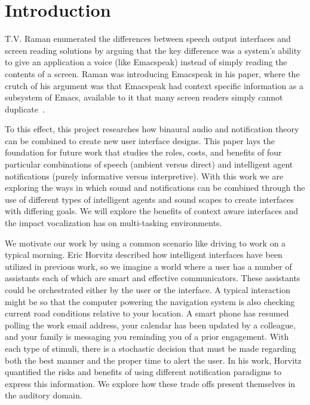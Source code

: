 \newpage                                                 \chapter{Introduction}
\renewcommand{\thepage }{\arabic{page}}                    \setcounter{page}{1}

T.V. Raman enumerated the differences between speech output interfaces and
screen reading solutions by arguing that the key difference was a system's
ability to give an application a voice (like Emacspeak) instead of simply reading 
the contents of a screen.  Raman was introducing Emacspeak in his paper, where 
the crutch of his argument was that Emacspeak had context specific information
as a subsystem of Emacs, available to it that many screen readers simply cannot 
duplicate~\cite{raman1996emacspeak}.

To this effect, this project researches how binaural audio and notification theory
can be combined to create new user interface designs. This paper lays the
foundation for future work that studies the roles, costs, and benefits  of four
particular combinations of speech (ambient versus direct) and intelligent agent
notifications (purely informative versus  interpretive). With this work we are 
exploring the ways in which sound and notifications can be combined through the 
use of different types of intelligent agents and sound scapes to create 
interfaces with differing goals.  We will explore the benefits of context
aware interfaces and the impact vocalization has on multi-tasking environments.

We motivate our work by using a common scenario like driving to work on a
typical morning. Eric Horvitz described how intelligent interfaces have been
utilized in previous work, so we imagine a world where a user has a number of
assistants each of which are smart and effective communicators. These assistants
could be orchestrated either by the user or the interface.  A typical
interaction  might be so that the computer powering the navigation system is
also checking current road conditions relative to your location. A smart phone
has resumed polling the work email address, your calendar has been updated by a
colleague, and your family is messaging you reminding you of a prior engagement.
With each type of stimuli, there is a stochastic decision that must be made
regarding both the best manner and the proper time to alert the user. In his
work, Horvitz quantified the risks and benefits of using different notification
paradigms to express this information. We explore how these trade offs present
themselves in the auditory domain.


